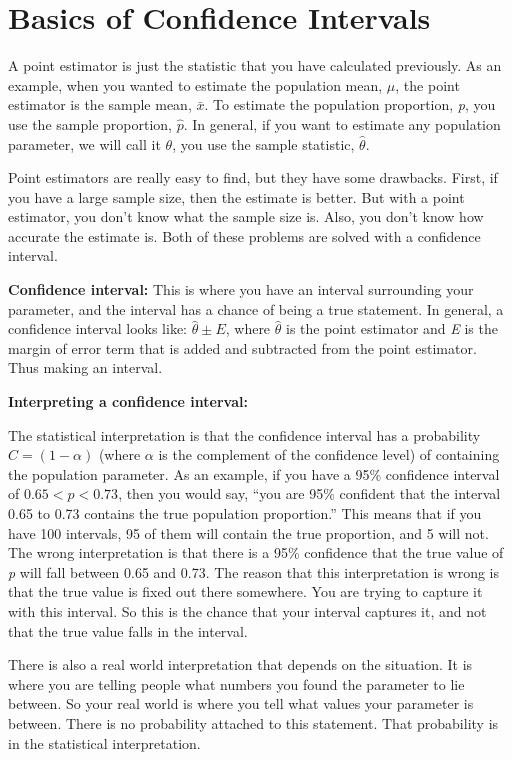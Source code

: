 \documentclass[
]{book}
\begin{document}
\hypertarget{basics-of-confidence-intervals}{%
\section{Basics of Confidence Intervals}\label{basics-of-confidence-intervals}}

A point estimator is just the statistic that you have calculated previously. As an example, when you wanted to estimate the population mean, \(\mu\), the point estimator is the sample mean, \(\bar{x}\). To estimate the population proportion, \emph{p}, you use the sample proportion, \(\hat{p}\). In general, if you want to estimate any population parameter, we will call it \(\theta\), you use the sample statistic, \(\hat{\theta}\).

Point estimators are really easy to find, but they have some drawbacks. First, if you have a large sample size, then the estimate is better. But with a point estimator, you don't know what the sample size is. Also, you don't know how accurate the estimate is. Both of these problems are solved with a confidence interval.

\textbf{Confidence interval:} This is where you have an interval surrounding your parameter, and the interval has a chance of being a true statement. In general, a confidence interval looks like: \(\hat{\theta}\pm E\), where \(\hat{\theta}\) is the point estimator and \emph{E} is the margin of error term that is added and subtracted from the point estimator. Thus making an interval.

\textbf{Interpreting a confidence interval: }

The statistical interpretation is that the confidence interval has a probability \(C=(1-\alpha)\) (where \(\alpha\) is the complement of the confidence level) of containing the population parameter. As an example, if you have a 95\% confidence interval of \(0.65 < p < 0.73\), then you would say, ``you are 95\% confident that the interval 0.65 to 0.73 contains the true population proportion.'' This means that if you have 100 intervals, 95 of them will contain the true proportion, and 5 will not. The wrong interpretation is that there is a 95\% confidence that the true value of \emph{p} will fall between 0.65 and 0.73. The reason that this interpretation is wrong is that the true value is fixed out there somewhere. You are trying to capture it with this interval. So this is the chance that your interval captures it, and not that the true value falls in the interval.

There is also a real world interpretation that depends on the situation. It is where you are telling people what numbers you found the parameter to lie between. So your real world is where you tell what values your parameter is between. There is no probability attached to this statement. That probability is in the statistical interpretation.
\end{document}
